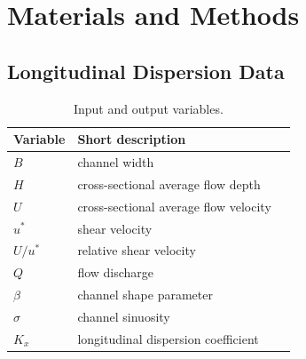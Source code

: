 \documentclass[a4paper,12pt, english]{article}
\begin{document}
\section{\label{sec:methods} Materials and Methods}
  
\subsection{\label{sec:methods:dataset} Longitudinal Dispersion Data}
\begin{table}[!h]
\centering
\caption{ \label{tab:input-output-var} Input and output variables.}
\begin{center}
\begin{tabular}{lll}
 \hline
Variable       & Short description                           \\ \hline
$ B     $      &     channel width                           \\
$ H     $      &     cross-sectional average flow depth      \\
$ U     $      &     cross-sectional average flow velocity   \\
$ u^*   $      &     shear velocity                          \\
$ U/u^* $      &     relative shear velocity                 \\
$ Q     $      &     flow discharge                          \\
$ \beta $      &     channel shape parameter                 \\
$ \sigma$      &     channel sinuosity                       \\\hline
$ K_x   $      &     longitudinal dispersion coefficient     \\ \hline
\end{tabular}
\end{center}
\end{table}


\end{document}
